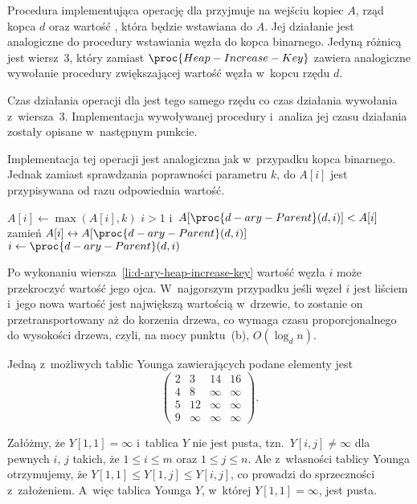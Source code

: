 \subproblem %
Procedura  implementująca operację  dla  przyjmuje na wejściu kopiec $A$, rząd kopca $d$ oraz wartość , która będzie wstawiana do $A$. Jej działanie jest analogiczne do procedury wstawiania węzła do kopca binarnego. Jedyną różnicą jest wiersz~3, który zamiast $\proc{Heap-Increase-Key}$ zawiera analogiczne wywołanie procedury  zwiększającej wartość węzła w~kopcu rzędu $d$.

Czas działania operacji  dla  jest tego samego rzędu co czas działania wywołania z~wiersza~3. Implementacja wywoływanej procedury  i~analiza jej czasu działania zostały opisane w~następnym punkcie.

\subproblem %
Implementacja tej operacji jest analogiczna jak w~przypadku kopca binarnego. Jednak zamiast sprawdzania poprawności parametru $k$, do $A[i]$ jest przypisywana od razu odpowiednia wartość.
\begin{codebox}
\li	$A[i]\gets\max(A[i],k)$ \label{li:d-ary-heap-increase-key}
\li	\While $i>1$ i~$A[\proc{d-ary-Parent}(d,i)]<A[i]$
\li		\Do
			zamień $A[i]\leftrightarrow A[\proc{d-ary-Parent}(d,i)]$
\li			$i\gets\proc{d-ary-Parent}(d,i)$
		\End
\end{codebox}

Po wykonaniu wiersza~\ref{li:d-ary-heap-increase-key} wartość węzła $i$ może przekroczyć wartość jego ojca. W~najgorszym przypadku jeśli węzeł $i$ jest liściem i~jego nowa wartość jest największą wartością w~drzewie, to zostanie on przetransportowany aż do korzenia drzewa, co wymaga czasu proporcjonalnego do wysokości drzewa, czyli, na mocy punktu~(b), $O(\log_dn)$.


\subproblem %
Jedną z~możliwych tablic Younga zawierających podane elementy jest
\[
	\begin{pmatrix}
		2 & 3 & 14 & 16 \\
		4 & 8 & \infty & \infty \\
		5 & 12 & \infty & \infty \\
		9 & \infty& \infty & \infty
	\end{pmatrix}.
\]

\subproblem %
Załóżmy, że $Y[1,1]=\infty$ i~tablica $Y$ nie jest pusta, tzn.\ $Y[i,j]\ne\infty$ dla pewnych $i$, $j$ takich, że $1\le i\le m$ oraz $1\le j\le n$. Ale z~własności tablicy Younga otrzymujemy, że $Y[1,1]\le Y[1,j]\le Y[i,j]$, co prowadzi do sprzeczności z~założeniem. A~więc tablica Younga $Y$, w~której $Y[1,1]=\infty$, jest pusta.

